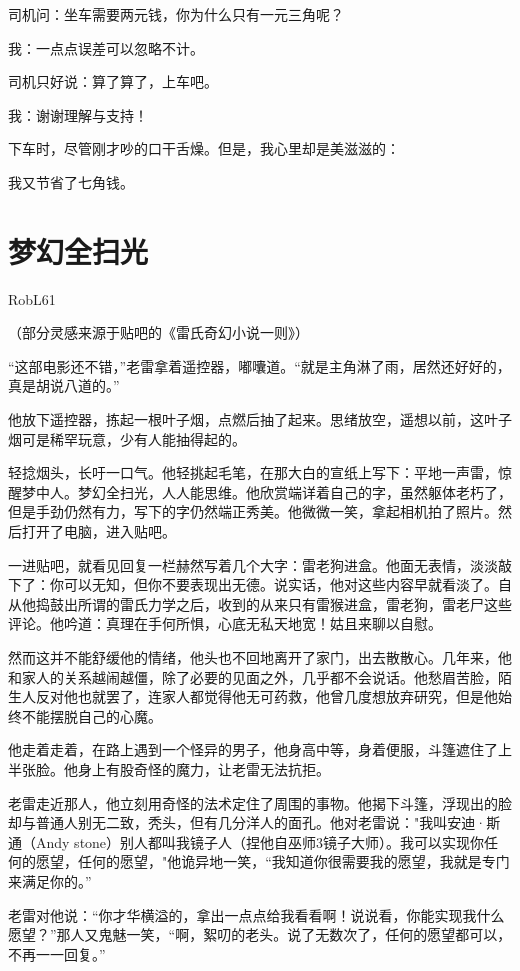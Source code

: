 \documentclass[UTF8,12pt,oneside]{ctexbook}
\begin{document}
司机问：坐车需要两元钱，你为什么只有一元三角呢？

我：一点点误差可以忽略不计。

司机只好说：算了算了，上车吧。

我：谢谢理解与支持！

下车时，尽管刚才吵的口干舌燥。但是，我心里却是美滋滋的：

我又节省了七角钱。

\newpage

\section{梦幻全扫光}
\begin{center}
    RobL61
\end{center}

（部分灵感来源于贴吧的《雷氏奇幻小说一则》）

“这部电影还不错，”老雷拿着遥控器，嘟囔道。“就是主角淋了雨，居然还好好的，真是胡说八道的。”

他放下遥控器，拣起一根叶子烟，点燃后抽了起来。思绪放空，遥想以前，这叶子烟可是稀罕玩意，少有人能抽得起的。

轻捻烟头，长吁一口气。他轻挑起毛笔，在那大白的宣纸上写下：平地一声雷，惊醒梦中人。梦幻全扫光，人人能思维。他欣赏端详着自己的字，虽然躯体老朽了，但是手劲仍然有力，写下的字仍然端正秀美。他微微一笑，拿起相机拍了照片。然后打开了电脑，进入贴吧。

一进贴吧，就看见回复一栏赫然写着几个大字：雷老狗进盒。他面无表情，淡淡敲下了：你可以无知，但你不要表现出无德。说实话，他对这些内容早就看淡了。自从他捣鼓出所谓的雷氏力学之后，收到的从来只有雷猴进盒，雷老狗，雷老尸这些评论。他吟道：真理在手何所惧，心底无私天地宽！姑且来聊以自慰。

然而这并不能舒缓他的情绪，他头也不回地离开了家门，出去散散心。几年来，他和家人的关系越闹越僵，除了必要的见面之外，几乎都不会说话。他愁眉苦脸，陌生人反对他也就罢了，连家人都觉得他无可药救，他曾几度想放弃研究，但是他始终不能摆脱自己的心魔。

他走着走着，在路上遇到一个怪异的男子，他身高中等，身着便服，斗篷遮住了上半张脸。他身上有股奇怪的魔力，让老雷无法抗拒。

老雷走近那人，他立刻用奇怪的法术定住了周围的事物。他揭下斗篷，浮现出的脸却与普通人别无二致，秃头，但有几分洋人的面孔。他对老雷说："我叫安迪·斯通（Andy stone）别人都叫我镜子人（捏他自巫师3镜子大师）。我可以实现你任何的愿望，任何的愿望，"他诡异地一笑，“我知道你很需要我的愿望，我就是专门来满足你的。”

老雷对他说：“你才华横溢的，拿出一点点给我看看啊！说说看，你能实现我什么愿望？”那人又鬼魅一笑，“啊，絮叨的老头。说了无数次了，任何的愿望都可以，不再一一回复。”
\end{document}
